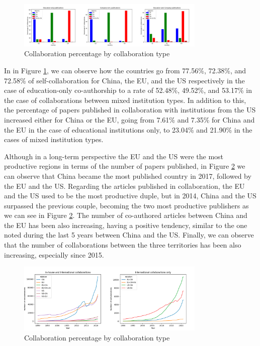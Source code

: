 \begin{figure}[tb]
    \centering
    \includegraphics[width=0.8\textwidth]{images/collaboration_percentage_by_collab_type.png}
    \caption{Collaboration percentage by collaboration type}
    \label{fig:collaboration_percentage_by_collab_type}
\end{figure}

In in Figure \ref{fig:collaboration_percentage_by_collab_type}, we can observe how the countries go from 77.56\%, 72.38\%, and 72.58\% of self-collaboration for China, the EU, and the US respectively in the case of education-only co-authorship to a rate of 52.48\%, 49.52\%, and 53.17\% in the case of collaborations between mixed institution types. In addition to this, the percentage of papers published in collaboration with institutions from the US increased either for China or the EU, going from 7.61\% and 7.35\% for China and the EU in the case of educational institutions only, to 23.04\% and 21.90\% in the cases of mixed institution types.



Although in a long-term perspective the EU and the US were the most productive regions in terms of the number of papers published, in Figure \ref{fig:collaborations_between_countries_per_year} we can observe that China became the most published country in 2017, followed by the EU and the US. Regarding the articles published in collaboration, the EU and the US used to be the most productive duple, but in 2014, China and the US surpassed the previous couple, becoming the two most productive publishers as we can see in Figure \ref{fig:collaborations_between_countries_per_year}. The number of co-authored articles between China and the EU has been also increasing, having a positive tendency, similar to the one noted during the last 5 years between China and the US. Finally, we can observe that the number of collaborations between the three territories has been also increasing, especially since 2015.

\begin{figure}[tb]
    \centering
    \includegraphics[width=0.8\textwidth]{images/collaborations_between_countries_per_year.png}
    \caption{Collaboration percentage by collaboration type}
    \label{fig:collaborations_between_countries_per_year}
\end{figure}

